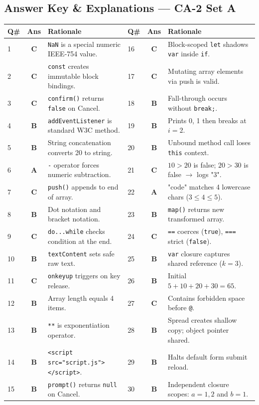 \newpage
\subsection*{Answer Key \& Explanations --- CA-2 Set A}

\begin{center}
\begin{tabularx}{\textwidth}{l c X l c X}
\toprule
\textbf{Q\#} & \textbf{Ans} & \textbf{Rationale} & \textbf{Q\#} & \textbf{Ans} & \textbf{Rationale} \\
\midrule
1 & \textbf{C} & \texttt{NaN} is a special numeric IEEE-754 value. & 16 & \textbf{C} & Block-scoped \texttt{let} shadows \texttt{var} inside \texttt{if}. \\
2 & \textbf{C} & \texttt{const} creates immutable block bindings. & 17 & \textbf{C} & Mutating array elements via push is valid. \\
3 & \textbf{C} & \texttt{confirm()} returns \texttt{false} on Cancel. & 18 & \textbf{B} & Fall-through occurs without \texttt{break;}. \\
4 & \textbf{B} & \texttt{addEventListener} is standard W3C method. & 19 & \textbf{B} & Prints 0, 1 then breaks at $i=2$. \\
5 & \textbf{B} & String concatenation converts 20 to string. & 20 & \textbf{B} & Unbound method call loses \texttt{this} context. \\
6 & \textbf{A} & \texttt{-} operator forces numeric subtraction. & 21 & \textbf{C} & $10>20$ is false; $20>30$ is false $\to$ logs "3". \\
7 & \textbf{C} & \texttt{push()} appends to end of array. & 22 & \textbf{A} & "code" matches 4 lowercase chars ($3 \le 4 \le 5$). \\
8 & \textbf{B} & Dot notation and bracket notation. & 23 & \textbf{B} & \texttt{map()} returns new transformed array. \\
9 & \textbf{C} & \texttt{do...while} checks condition at the end. & 24 & \textbf{C} & \texttt{==} coerces (\texttt{true}), \texttt{===} strict (\texttt{false}). \\
10 & \textbf{B} & \texttt{textContent} sets safe raw text. & 25 & \textbf{B} & \texttt{var} closure captures shared reference ($k=3$). \\
11 & \textbf{C} & \texttt{onkeyup} triggers on key release. & 26 & \textbf{B} & Initial $5 + 10 + 20 + 30 = 65$. \\
12 & \textbf{B} & Array length equals 4 items. & 27 & \textbf{C} & Contains forbidden space before \texttt{@}. \\
13 & \textbf{B} & \texttt{**} is exponentiation operator. & 28 & \textbf{B} & Spread creates shallow copy; object pointer shared. \\
14 & \textbf{B} & \texttt{<script src="script.js"></script>}. & 29 & \textbf{B} & Halts default form submit reload. \\
15 & \textbf{B} & \texttt{prompt()} returns \texttt{null} on Cancel. & 30 & \textbf{B} & Independent closure scopes: $a=1,2$ and $b=1$. \\
\bottomrule
\end{tabularx}
\end{center}
